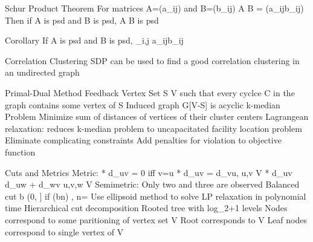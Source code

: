 	Schur Product Theorem
		For matrices A=(a_{ij}) and B=(b_{ij})
		A \dot B = (a_{ij}b_{ij})
		Then if A is psd and B is psd, A \dot B is psd

	Corollary
		If A is psd and B is psd, \sum_{i,j} a_{ij}b_{ij} 

	Correlation Clustering
		SDP can be used to find a good correlation clustering in an undirected graph




Primal-Dual Method
	Feedback Vertex Set
		S \subseteq V such that every cyclce C in the graph contains some vertex of S
			Induced graph G[V-S] is acyclic
	k-median Problem
		Minimize sum of distances of vertices of their cluster centers
		Lagrangean relaxation: reduces k-median problem to uncapacitated facility location problem
			Eliminate complicating constraints
			Add penalties for violation to objective function

Cuts and Metrics
	Metric:
		* d_{uv} = 0 iff v=u
		* d_{uv} = d_{vu}, \forall u,v \in V
		* d_{uv} \leq d_{uw} + d_{wv} \forall u,v,w \in V
	Semimetric: 
		Only two and three are observed
	Balanced cut
		b \in (0, ] if \floor(bn) \leq {} \leq {}, n=
		Use ellipsoid method to solve LP relaxation in polynomial time
	Hierarchical cut decomposition
		Rooted tree with log_{2}\Delta+1 levels
			Nodes correspond to some paritioning of vertex set V
				Root corresponds to V
				Leaf nodes correspond to single vertex of V